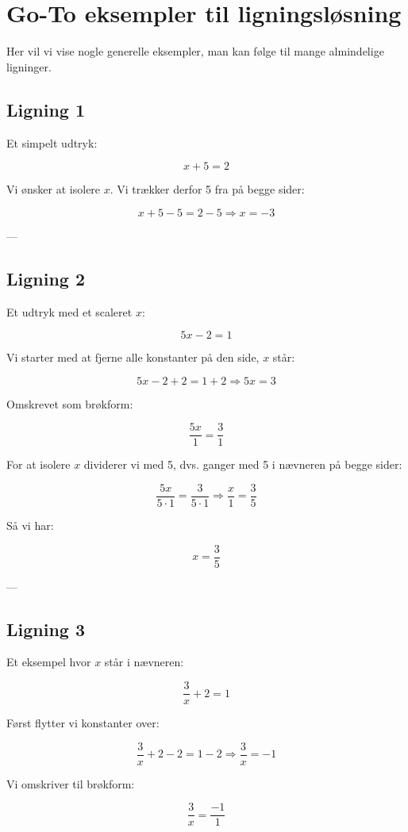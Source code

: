 \section{Go-To eksempler til ligningsløsning}

Her vil vi vise nogle generelle eksempler, man kan følge til mange almindelige ligninger.

\subsection*{Ligning 1}
Et simpelt udtryk:

\[
x + 5 = 2
\]

Vi ønsker at isolere $x$. Vi trækker derfor 5 fra på begge sider:

\[
x + 5 - 5 = 2 - 5 \Rightarrow x = -3
\]

---

\subsection*{Ligning 2}
Et udtryk med et scaleret $x$:

\[
5x - 2 = 1
\]

Vi starter med at fjerne alle konstanter på den side, $x$ står:

\[
5x - 2 + 2 = 1 + 2 \Rightarrow 5x = 3
\]

Omskrevet som brøkform:

\[
\frac{5x}{1} = \frac{3}{1}
\]

For at isolere $x$ dividerer vi med 5, dvs. ganger med 5 i nævneren på begge sider:

\[
\frac{5x}{5 \cdot 1} = \frac{3}{5 \cdot 1} \Rightarrow \frac{x}{1} = \frac{3}{5}
\]

Så vi har:

\[
x = \frac{3}{5}
\]

---

\subsection*{Ligning 3}
Et eksempel hvor $x$ står i nævneren:

\[
\frac{3}{x} + 2 = 1
\]

Først flytter vi konstanter over:

\[
\frac{3}{x} + 2 - 2 = 1 - 2 \Rightarrow \frac{3}{x} = -1
\]

Vi omskriver til brøkform:

\[
\frac{3}{x} = \frac{-1}{1}
\]

